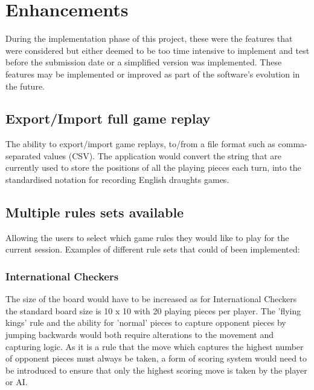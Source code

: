 \documentclass[10pt, a4paper]{article}
\begin{document}
    
    
    
    
    
    
    

    
    
    
\section{Enhancements}
During the implementation phase of this project, these were the features that were considered but either deemed to be too time intensive to implement and test before the submission date or a simplified version was implemented. These features may be implemented or improved as part of the software's evolution in the future.


    \subsection{Export/Import full game replay}
    The ability to export/import game replays, to/from a file format such as comma-separated values (CSV).     
    The application would convert the string that are currently used to store the positions of all the playing pieces each turn, into the standardised notation for recording English draughts games. 
    
       
    \subsection{Multiple rules sets available}
    Allowing the users to select which game rules they would like to play for the current session. Examples of different rule sets that could of been implemented:
     
    
    	\subsubsection{International Checkers}
    	The size of the board would have to be increased as for International Checkers the standard board size is 10 x 10 with 20 playing pieces per player. The 'flying kings' rule and the ability for 'normal' pieces to capture opponent pieces by jumping backwards would both require alterations to the movement and capturing logic.    
    	As it is a rule that the move which captures the highest number of opponent pieces must always be taken, a form of scoring system would need to be introduced to ensure that only the highest scoring move is taken by the player or AI.
    	
\end{document}
